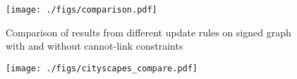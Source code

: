 
\begin{figure}[t]
\centering
\texttt{[image: ./figs/comparison.pdf]} %
\caption{
{\small Comparison of results from different update rules on signed graph with and without cannot-link constraints 
}
\label{fig:cremi_comparison}}
\end{figure}
\begin{figure}[b]
\centering
\texttt{[image: ./figs/cityscapes\_compare.pdf]} %
\caption{
 \label{fig:cytiscapes_comparison}}
\end{figure}




